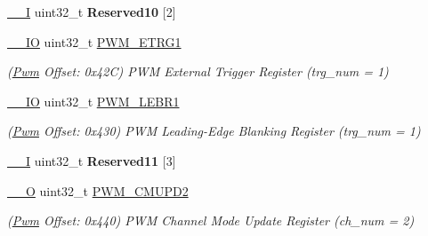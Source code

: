 \begin{DoxyCompactItemize}
\mbox{\label{structPwm_a3dbddd165d3262114572d5ebb877e4c6}} 
\mbox{\hyperlink{core__cm7_8h_af63697ed9952cc71e1225efe205f6cd3}{\+\_\+\+\_\+I}} uint32\+\_\+t {\bfseries Reserved10} \mbox{[}2\mbox{]}
\item 
\mbox{\label{structPwm_aa79825783f70ac69e200029c7858b309}} 
\mbox{\hyperlink{core__cm7_8h_aec43007d9998a0a0e01faede4133d6be}{\+\_\+\+\_\+\+IO}} uint32\+\_\+t \mbox{\hyperlink{structPwm_aa79825783f70ac69e200029c7858b309}{P\+W\+M\+\_\+\+E\+T\+R\+G1}}
\begin{DoxyCompactList}\small\item\em (\mbox{\hyperlink{structPwm}{Pwm}} Offset\+: 0x42C) P\+WM External Trigger Register (trg\+\_\+num = 1) \end{DoxyCompactList}\item 
\mbox{\label{structPwm_a6daf0d3cf7806f04cf6fdfdf1068b79e}} 
\mbox{\hyperlink{core__cm7_8h_aec43007d9998a0a0e01faede4133d6be}{\+\_\+\+\_\+\+IO}} uint32\+\_\+t \mbox{\hyperlink{structPwm_a6daf0d3cf7806f04cf6fdfdf1068b79e}{P\+W\+M\+\_\+\+L\+E\+B\+R1}}
\begin{DoxyCompactList}\small\item\em (\mbox{\hyperlink{structPwm}{Pwm}} Offset\+: 0x430) P\+WM Leading-\/\+Edge Blanking Register (trg\+\_\+num = 1) \end{DoxyCompactList}\item 
\mbox{\label{structPwm_a3388eb86191d53a04071ec30ffe16faf}} 
\mbox{\hyperlink{core__cm7_8h_af63697ed9952cc71e1225efe205f6cd3}{\+\_\+\+\_\+I}} uint32\+\_\+t {\bfseries Reserved11} \mbox{[}3\mbox{]}
\item 
\mbox{\label{structPwm_a44305cae6a0e803334e9a34ad5238555}} 
\mbox{\hyperlink{core__cm7_8h_a7e25d9380f9ef903923964322e71f2f6}{\+\_\+\+\_\+O}} uint32\+\_\+t \mbox{\hyperlink{structPwm_a44305cae6a0e803334e9a34ad5238555}{P\+W\+M\+\_\+\+C\+M\+U\+P\+D2}}
\begin{DoxyCompactList}\small\item\em (\mbox{\hyperlink{structPwm}{Pwm}} Offset\+: 0x440) P\+WM Channel Mode Update Register (ch\+\_\+num = 2) \end{DoxyCompactList}\item 
\mbox{\label{structPwm_ab764ec36d04c0ebb08a86054274b9c20}} 

\end{DoxyCompactItemize}
